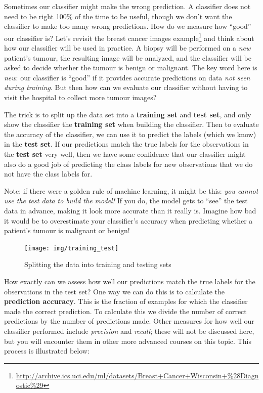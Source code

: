 \documentclass[
]{krantz}
\renewenvironment{quote}{\begin{VF}}{\end{VF}}
\renewcommand{\href}[2]{#2\footnote{\url{#1}}}
\begin{document}
Sometimes our classifier might make the wrong prediction. A classifier does not
need to be right 100\% of the time to be useful, though we don't want the
classifier to make too many wrong predictions. How do we measure how ``good'' our
classifier is? Let's revisit the
\href{http://archive.ics.uci.edu/ml/datasets/Breast+Cancer+Wisconsin+\%28Diagnostic\%29}{breast cancer images example}
and think about how our classifier will be used in practice. A biopsy will be
performed on a \emph{new} patient's tumour, the resulting image will be analyzed,
and the classifier will be asked to decide whether the tumour is benign or
malignant. The key word here is \emph{new}: our classifier is ``good'' if it provides
accurate predictions on data \emph{not seen during training}. But then how can we
evaluate our classifier without having to visit the hospital to collect more
tumour images?

The trick is to split up the data set into a \textbf{training set} and \textbf{test set},
and only show the classifier the \textbf{training set} when building the classifier.
Then to evaluate the accuracy of the classifier, we can use it to predict the
labels (which we know) in the \textbf{test set}. If our predictions match the true
labels for the observations in the \textbf{test set} very well, then we have some
confidence that our classifier might also do a good job of predicting the class
labels for new observations that we do not have the class labels for.

\begin{quote}
Note: if there were a golden rule of machine learning, it might be this: \emph{you cannot use the test data to build the model!}
If you do, the model gets to ``see'' the test data in advance, making it look more accurate than it really is. Imagine
how bad it would be to overestimate your classifier's accuracy when predicting whether a patient's tumour is malignant or benign!
\end{quote}

\begin{figure}
\texttt{[image: img/training\_test]} \caption{Splitting the data into training and testing sets}\label{fig:06-training-test}
\end{figure}

How exactly can we assess how well our predictions match the true labels for
the observations in the test set? One way we can do this is to calculate the
\textbf{prediction accuracy}. This is the fraction of examples for which the
classifier made the correct prediction. To calculate this we divide the number
of correct predictions by the number of predictions made. Other measures for
how well our classifier performed include \emph{precision} and \emph{recall}; these will
not be discussed here, but you will encounter them in other more advanced
courses on this topic. This process is illustrated below:
\end{document}
